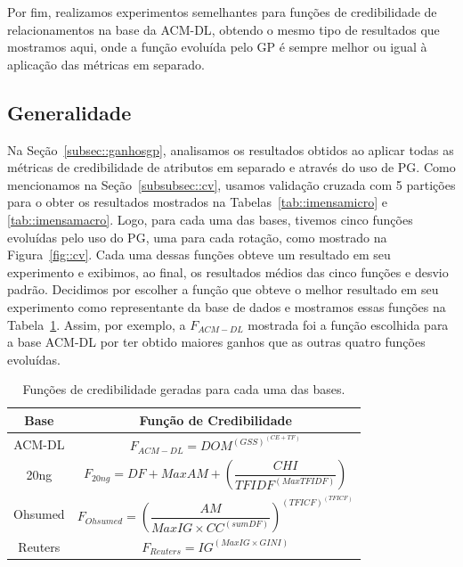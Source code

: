 Por fim, realizamos experimentos semelhantes para funções de credibilidade de relacionamentos na base da \textsc{ACM-DL}, obtendo o mesmo tipo de resultados que mostramos aqui, onde a função evoluída pelo \textsc{GP} é sempre melhor ou igual à aplicação das métricas em separado.





\subsection{Generalidade}
\label{subsec::generalidade}

Na Seção~\ref{subsec::ganhosgp}, analisamos os resultados obtidos ao aplicar todas as métricas de credibilidade de atributos em separado e através do uso de \textsc{PG}.
Como mencionamos na Seção~\ref{subsubsec::cv}, usamos validação cruzada com 5 partições para o obter os resultados mostrados na Tabelas~\ref{tab::imensamicro} e \ref{tab::imensamacro}.
Logo, para cada uma das bases, tivemos cinco funções evoluídas pelo uso do \textsc{PG}, uma para cada rotação, como mostrado na Figura~\ref{fig::cv}.
Cada uma dessas funções obteve um resultado em seu experimento e exibimos, ao final, os resultados médios das cinco funções e desvio padrão.
Decidimos por escolher a função que obteve o melhor resultado em seu experimento como representante da base de dados e mostramos essas funções na Tabela~\ref{tab::representantes}.
Assim, por exemplo, a $F_{ACM-DL}$ mostrada foi a função escolhida para a base \textsc{ACM-DL} por ter obtido maiores ganhos que as outras quatro funções evoluídas.

\begin{table}[!h]
\renewcommand{\arraystretch}{1.3}
\centering
\caption{Funções de credibilidade geradas para cada uma das bases.}
\label{tab::representantes}
\begin{scriptsize}
\begin{tabular}{|c||c|}
\toprule
\textbf{Base} & \textbf{Função de Credibilidade}\tabularnewline
\midrule
\hline
ACM-DL   & $F_{ACM-DL} =  DOM^{(GSS)^{(CE + TF)}} $\tabularnewline
\hline
20ng & $F_{20ng} = DF + MaxAM + (\dfrac{ CHI } { TFIDF^{(MaxTFIDF)} }) $\tabularnewline
\hline
Ohsumed  & $ F_{Ohsumed} = (\dfrac{AM}{MaxIG \times CC^{(sumDF)}} )^{(TFICF)^{(TFICF)}} $\tabularnewline
\hline
Reuters & $ F_{Reuters} = IG^{(MaxIG \times GINI)}$\tabularnewline
\bottomrule
\end{tabular}
\end{scriptsize}
\end{table}

